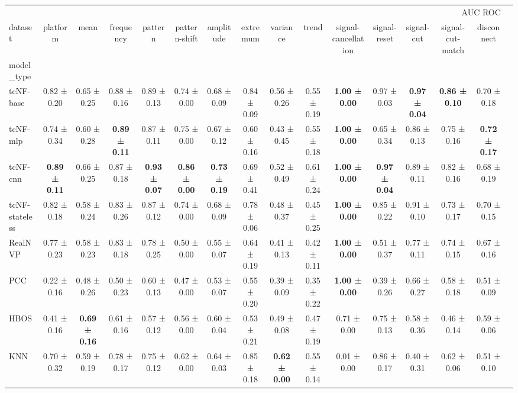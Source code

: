 \begin{tabular}{lccccccccccccccc}
\toprule
 & \multicolumn{14}{r}{AUC ROC} \\
dataset & platform & mean & frequency & pattern & pattern-shift & amplitude & extremum & variance & trend & signal-cancellation & signal-reset & signal-cut & signal-cut-match & disconnect \\
model_type &  &  &  &  &  &  &  &  &  &  &  &  &  &  \\
\midrule
tcNF-base & 0.82 ± 0.20 & 0.65 ± 0.25 & 0.88 ± 0.16 & 0.89 ± 0.13 & 0.74 ± 0.00 & 0.68 ± 0.09 & 0.84 ± 0.09 & 0.56 ± 0.26 & 0.55 ± 0.19 & \bfseries 1.00 ± 0.00 & 0.97 ± 0.03 & \bfseries 0.97 ± 0.04 & \bfseries 0.86 ± 0.10 & 0.70 ± 0.18 \\
tcNF-mlp & 0.74 ± 0.34 & 0.60 ± 0.28 & \bfseries 0.89 ± 0.11 & 0.87 ± 0.11 & 0.75 ± 0.00 & 0.67 ± 0.12 & 0.60 ± 0.16 & 0.43 ± 0.45 & 0.55 ± 0.18 & \bfseries 1.00 ± 0.00 & 0.65 ± 0.34 & 0.86 ± 0.13 & 0.75 ± 0.16 & \bfseries 0.72 ± 0.17 \\
tcNF-cnn & \bfseries 0.89 ± 0.11 & 0.66 ± 0.25 & 0.87 ± 0.18 & \bfseries 0.93 ± 0.07 & \bfseries 0.86 ± 0.00 & \bfseries 0.73 ± 0.19 & 0.69 ± 0.41 & 0.52 ± 0.49 & 0.61 ± 0.24 & \bfseries 1.00 ± 0.00 & \bfseries 0.97 ± 0.04 & 0.89 ± 0.11 & 0.82 ± 0.16 & 0.68 ± 0.19 \\
tcNF-stateless & 0.82 ± 0.18 & 0.58 ± 0.24 & 0.83 ± 0.26 & 0.87 ± 0.12 & 0.74 ± 0.00 & 0.68 ± 0.09 & 0.78 ± 0.06 & 0.48 ± 0.37 & 0.45 ± 0.25 & \bfseries 1.00 ± 0.00 & 0.85 ± 0.22 & 0.91 ± 0.10 & 0.73 ± 0.17 & 0.70 ± 0.15 \\
RealNVP & 0.77 ± 0.23 & 0.58 ± 0.23 & 0.83 ± 0.18 & 0.78 ± 0.25 & 0.50 ± 0.00 & 0.55 ± 0.07 & 0.64 ± 0.19 & 0.41 ± 0.13 & 0.42 ± 0.11 & \bfseries 1.00 ± 0.00 & 0.51 ± 0.37 & 0.77 ± 0.11 & 0.74 ± 0.15 & 0.67 ± 0.16 \\
PCC & 0.22 ± 0.16 & 0.48 ± 0.26 & 0.50 ± 0.23 & 0.60 ± 0.13 & 0.47 ± 0.00 & 0.53 ± 0.07 & 0.55 ± 0.20 & 0.39 ± 0.09 & 0.35 ± 0.22 & \bfseries 1.00 ± 0.00 & 0.39 ± 0.26 & 0.66 ± 0.27 & 0.58 ± 0.18 & 0.51 ± 0.09 \\
HBOS & 0.41 ± 0.16 & \bfseries 0.69 ± 0.16 & 0.61 ± 0.16 & 0.57 ± 0.12 & 0.56 ± 0.00 & 0.60 ± 0.04 & 0.53 ± 0.21 & 0.49 ± 0.08 & 0.47 ± 0.19 & 0.71 ± 0.00 & 0.75 ± 0.13 & 0.58 ± 0.36 & 0.46 ± 0.14 & 0.59 ± 0.06 \\
KNN & 0.70 ± 0.32 & 0.59 ± 0.19 & 0.78 ± 0.17 & 0.75 ± 0.12 & 0.62 ± 0.00 & 0.64 ± 0.03 & 0.85 ± 0.18 & \bfseries 0.62 ± 0.00 & 0.55 ± 0.14 & 0.01 ± 0.00 & 0.86 ± 0.17 & 0.40 ± 0.31 & 0.62 ± 0.06 & 0.51 ± 0.10 \\

\end{tabular}
